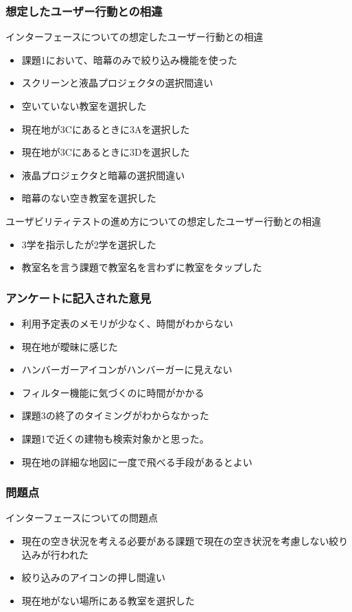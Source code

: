 \documentclass[12pt,a4paper,dvipdf]{jsarticle}
\begin{document}
\subsubsection{想定したユーザー行動との相違}
\noindent
インターフェースについての想定したユーザー行動との相違
\begin{itemize}
    \item 課題1において、暗幕のみで絞り込み機能を使った
    \item スクリーンと液晶プロジェクタの選択間違い
    \item 空いていない教室を選択した
    \item 現在地が3Cにあるときに3Aを選択した
    \item 現在地が3Cにあるときに3Dを選択した
    \item 液晶プロジェクタと暗幕の選択間違い
    \item 暗幕のない空き教室を選択した
\end{itemize}
ユーザビリティテストの進め方についての想定したユーザー行動との相違
\begin{itemize}
    \item 3学を指示したが2学を選択した
    \item 教室名を言う課題で教室名を言わずに教室をタップした
\end{itemize}

\subsubsection{アンケートに記入された意見}
\begin{itemize}
    \item 利用予定表のメモリが少なく、時間がわからない
    \item 現在地が曖昧に感じた
    \item ハンバーガーアイコンがハンバーガーに見えない
    \item フィルター機能に気づくのに時間がかかる
    \item 課題3の終了のタイミングがわからなかった
    \item 課題1で近くの建物も検索対象かと思った。
    \item 現在地の詳細な地図に一度で飛べる手段があるとよい
\end{itemize}
\subsubsection{問題点}
インターフェースについての問題点
\begin{itemize}
    \item 現在の空き状況を考える必要がある課題で現在の空き状況を考慮しない絞り込みが行われた
    \item 絞り込みのアイコンの押し間違い
    \item 現在地がない場所にある教室を選択した
\end{itemize}
\end{document}
